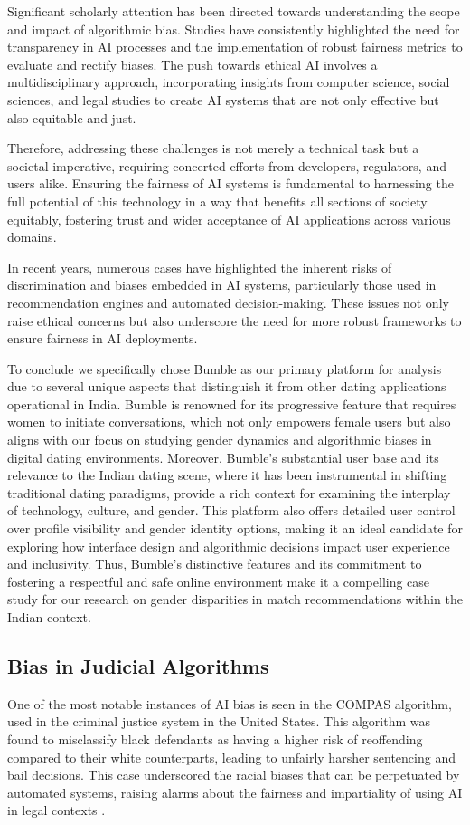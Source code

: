 Significant scholarly attention has been directed towards understanding the scope and impact of algorithmic bias. Studies have consistently highlighted the need for transparency in AI processes and the implementation of robust fairness metrics to evaluate and rectify biases. The push towards ethical AI involves a multidisciplinary approach, incorporating insights from computer science, social sciences, and legal studies to create AI systems that are not only effective but also equitable and just.

Therefore, addressing these challenges is not merely a technical task but a societal imperative, requiring concerted efforts from developers, regulators, and users alike. Ensuring the fairness of AI systems is fundamental to harnessing the full potential of this technology in a way that benefits all sections of society equitably, fostering trust and wider acceptance of AI applications across various domains.

In recent years, numerous cases have highlighted the inherent risks of discrimination and biases embedded in AI systems, particularly those used in recommendation engines and automated decision-making. These issues not only raise ethical concerns but also underscore the need for more robust frameworks to ensure fairness in AI deployments.

To conclude we specifically chose Bumble as our primary platform for analysis due to several unique aspects that distinguish it from other dating applications operational in India. Bumble is renowned for its progressive feature that requires women to initiate conversations, which not only empowers female users but also aligns with our focus on studying gender dynamics and algorithmic biases in digital dating environments. Moreover, Bumble's substantial user base and its relevance to the Indian dating scene, where it has been instrumental in shifting traditional dating paradigms, provide a rich context for examining the interplay of technology, culture, and gender. This platform also offers detailed user control over profile visibility and gender identity options, making it an ideal candidate for exploring how interface design and algorithmic decisions impact user experience and inclusivity. Thus, Bumble’s distinctive features and its commitment to fostering a respectful and safe online environment make it a compelling case study for our research on gender disparities in match recommendations within the Indian context.

\subsection{Bias in Judicial Algorithms}
One of the most notable instances of AI bias is seen in the COMPAS algorithm, used in the criminal justice system in the United States. This algorithm was found to misclassify black defendants as having a higher risk of reoffending compared to their white counterparts, leading to unfairly harsher sentencing and bail decisions. This case underscored the racial biases that can be perpetuated by automated systems, raising alarms about the fairness and impartiality of using AI in legal contexts \cite{Mattu_COMPAS}.

